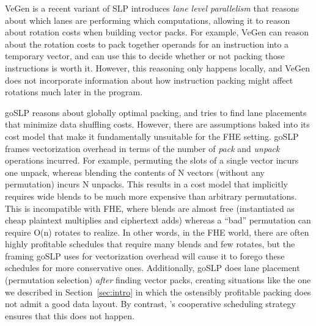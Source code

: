 VeGen \cite{VeGen} is a recent variant of SLP introduces {\em lane level parallelism} that reasons about which lanes are performing which computations, allowing it to reason about rotation costs when building vector packs.
For example, VeGen can reason about the rotation costs to pack together operands for an instruction into a temporary vector, and can use this to decide whether or not packing those instructions is worth it.
However, this reasoning only happens locally, and VeGen does not incorporate information about how instruction packing might affect rotations much later in the program.

goSLP \cite{goSLP} reasons about globally optimal packing, and tries to find lane placements that minimize data shuffling costs. 
However, there are assumptions baked into its cost model that make it fundamentally unsuitable for the FHE setting.
goSLP frames vectorization overhead in terms of the number of {\em pack} and {\em unpack} operations incurred.
For example, permuting the slots of a single vector incurs one unpack, whereas blending the contents of N vectors (without any permutation) incurs N unpacks.
This results in a cost model that implicitly requires wide blends to be much more expensive than arbitrary permutations.
This is incompatible with FHE, where blends are almost free (instantiated as cheap plaintext multiplies and ciphertext adds) whereas a ``bad'' permutation can require O(n) rotates to realize.
In other words, in the FHE world, there are often highly profitable schedules that require many blends and few rotates, but the framing goSLP uses for vectorization overhead will cause it to forego these schedules for more conservative ones.
Additionally, goSLP does lane placement (permutation selection) {\em after} finding vector packs, creating situations like the one we described in Section~\ref{sec:intro} in which the ostensibly profitable packing does not admit a good data layout.
By contrast, \system's cooperative scheduling strategy ensures that this does not happen.


